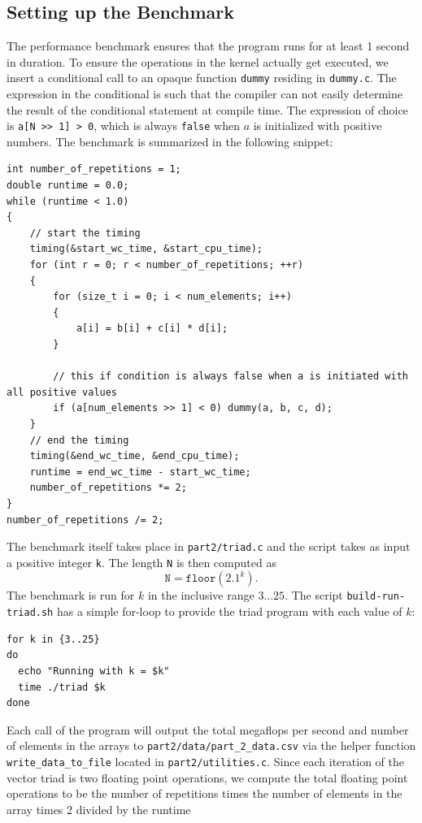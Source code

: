 \documentclass{article}
\begin{document}
\subsection*{Setting up the Benchmark}
The performance benchmark ensures that the program runs for at least 1 second in duration. 
To ensure the operations in the kernel actually get executed, we insert a conditional call 
to an opaque function \texttt{dummy} residing in \texttt{dummy.c}. The expression in the conditional 
is such that the compiler can not easily determine the result of the conditional statement at compile time. 
The expression of choice is \texttt{a[N >> 1] > 0}, which is always \texttt{false} when $a$ is initialized with positive numbers. 
The benchmark is summarized in the following snippet:
\newpage
\begin{lstlisting}
int number_of_repetitions = 1;
double runtime = 0.0;
while (runtime < 1.0)
{
    // start the timing
    timing(&start_wc_time, &start_cpu_time);
    for (int r = 0; r < number_of_repetitions; ++r)
    {
        for (size_t i = 0; i < num_elements; i++)
        {
            a[i] = b[i] + c[i] * d[i];
        }

        // this if condition is always false when a is initiated with all positive values
        if (a[num_elements >> 1] < 0) dummy(a, b, c, d);
    }
    // end the timing
    timing(&end_wc_time, &end_cpu_time);
    runtime = end_wc_time - start_wc_time;
    number_of_repetitions *= 2;
}
number_of_repetitions /= 2;
\end{lstlisting}
The benchmark itself takes place in \texttt{part2/triad.c} and the script 
takes as input a positive integer \texttt{k}. The length \texttt{N} is then computed as 
$$
\texttt{N} = \texttt{floor}(2.1^k).
$$
The benchmark is run for $k$ in the inclusive range $3...25$. The script \texttt{build-run-triad.sh} has a 
simple for-loop to provide the triad program with each value of $k$:
\begin{lstlisting}
for k in {3..25}
do
  echo "Running with k = $k"
  time ./triad $k
done
\end{lstlisting}
Each call of the program will output the total megaflops per second and number of elements in the arrays to 
\texttt{part2/data/part\_2\_data.csv} via the helper function \texttt{write\_data\_to\_file} located in 
\texttt{part2/utilities.c}. Since each iteration of the vector triad is two floating point operations, we compute the total 
floating point operations to be the number of repetitions times the number of elements in the array times 2 divided by the runtime 
\end{document}
